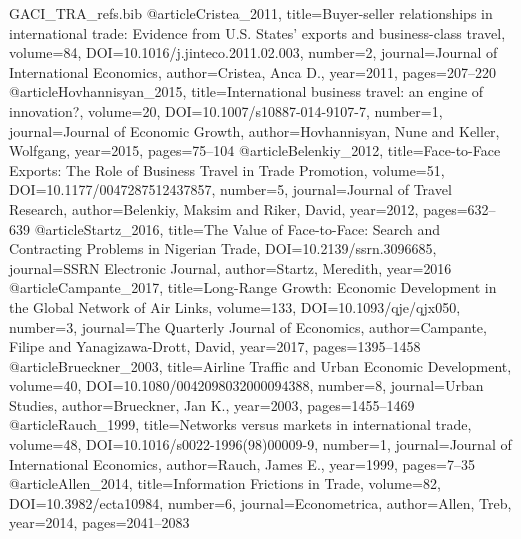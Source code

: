 \begin{filecontents*}[overwrite]{GACI_TRA_refs.bib}
@article{Cristea_2011, title={Buyer-seller relationships in international trade: Evidence from U.S. States' exports and business-class travel}, volume={84}, DOI={10.1016/j.jinteco.2011.02.003}, number={2}, journal={Journal of International Economics}, author={Cristea, Anca D.}, year={2011}, pages={207--220} }
@article{Hovhannisyan_2015, title={International business travel: an engine of innovation?}, volume={20}, DOI={10.1007/s10887-014-9107-7}, number={1}, journal={Journal of Economic Growth}, author={Hovhannisyan, Nune and Keller, Wolfgang}, year={2015}, pages={75--104} }
@article{Belenkiy_2012, title={Face-to-Face Exports: The Role of Business Travel in Trade Promotion}, volume={51}, DOI={10.1177/0047287512437857}, number={5}, journal={Journal of Travel Research}, author={Belenkiy, Maksim and Riker, David}, year={2012}, pages={632--639} }
@article{Startz_2016, title={The Value of Face-to-Face: Search and Contracting Problems in Nigerian Trade}, DOI={10.2139/ssrn.3096685}, journal={SSRN Electronic Journal}, author={Startz, Meredith}, year={2016} }
@article{Campante_2017, title={Long-Range Growth: Economic Development in the Global Network of Air Links}, volume={133}, DOI={10.1093/qje/qjx050}, number={3}, journal={The Quarterly Journal of Economics}, author={Campante, Filipe and Yanagizawa-Drott, David}, year={2017}, pages={1395--1458} }
@article{Brueckner_2003, title={Airline Traffic and Urban Economic Development}, volume={40}, DOI={10.1080/0042098032000094388}, number={8}, journal={Urban Studies}, author={Brueckner, Jan K.}, year={2003}, pages={1455--1469} }
@article{Rauch_1999, title={Networks versus markets in international trade}, volume={48}, DOI={10.1016/s0022-1996(98)00009-9}, number={1}, journal={Journal of International Economics}, author={Rauch, James E.}, year={1999}, pages={7--35} }
@article{Allen_2014, title={Information Frictions in Trade}, volume={82}, DOI={10.3982/ecta10984}, number={6}, journal={Econometrica}, author={Allen, Treb}, year={2014}, pages={2041--2083} }

\end{filecontents*}
